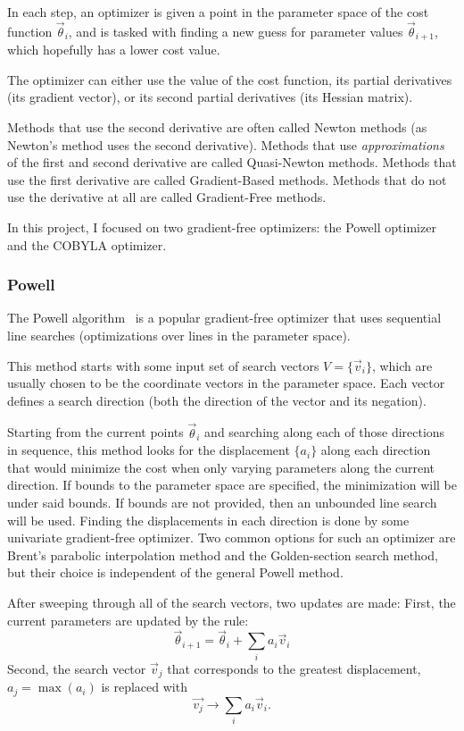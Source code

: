 \documentclass[a4paper,12pt]{article}
\newcommand{\thetas}{\vec{\theta}}
\begin{document}
In each step, an optimizer is given a point in the parameter space of the cost function $\thetas_{i}$, and is tasked with finding a new guess for parameter values $\thetas_{i+1}$, which hopefully has a lower cost value.

The optimizer can either use the value of the cost function, its partial derivatives (its gradient vector), or its second partial derivatives (its Hessian matrix).

Methods that use the second derivative are often called Newton methods (as Newton's method uses the second derivative). Methods that use \emph{approximations} of the first and second derivative are called Quasi-Newton methods.
Methods that use the first derivative are called Gradient-Based methods. Methods that do not use the derivative at all are called Gradient-Free methods.

In this project, I focused on two gradient-free optimizers: the Powell optimizer and the COBYLA optimizer.

\subsubsection{Powell}
The Powell algorithm~\cite{Powell1964} is a popular gradient-free optimizer that uses sequential line searches (optimizations over lines in the parameter space).

This method starts with some input set of search vectors $V = \{\vec{v}_i\}$, which are usually chosen to be the coordinate vectors in the parameter space. Each vector defines a search direction (both the direction of the vector and its negation).

Starting from the current points $\thetas_i$ and searching along each of those directions in sequence, this method looks for the displacement $\{a_i\}$ along each direction that would minimize the cost when only varying parameters along the current direction.
If bounds to the parameter space are specified, the minimization will be under said bounds. If bounds are not provided, then an unbounded line search will be used.
Finding the displacements in each direction is done by some univariate gradient-free optimizer.
Two common options for such an optimizer are Brent's parabolic interpolation method and the Golden-section search method, but their choice is independent of the general Powell method.

After sweeping through all of the search vectors, two updates are made:
First, the current parameters are updated by the rule:
\begin{equation}
    \thetas_{i+1} = \thetas_{i} + \sum_i a_i \vec{v}_i
\end{equation}
Second, the search vector $\vec{v}_j$ that corresponds to the greatest displacement, $a_j = \max(a_i)$ is replaced with
\begin{equation}
    \vec{v_j} \to \sum_i a_i \vec{v}_i.
\end{equation}
\end{document}
